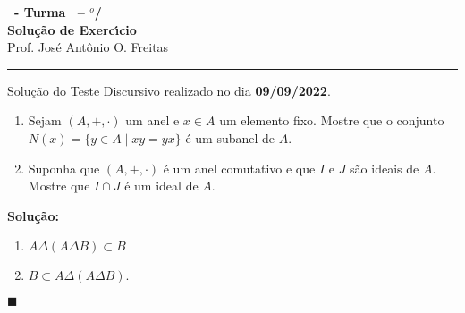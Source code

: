 \documentclass[12pt]{exam}
\renewcommand{\qedsymbol}{$\blacksquare$}
\begin{document}
    \begin{center}
        {\Large\bf \disciplina\ - Turma \turma\ -- \semestre$^{o}$/\ano} \\ \vspace{9pt} {\large\bf
        Solu\c{c}\~ao de Exerc{\'\i}cio}\\
        \vspace{9pt} Prof. Jos{\'e} Ant{\^o}nio O. Freitas
    \end{center}
    \hrule

    \vspace{.6cm}

    Solu\c{c}\~ao do Teste Discursivo realizado no dia \textbf{09/09/2022}.

    \vspace{.6cm}

    \questao{}
        \begin{enumerate}[label={\arabic*})]
            \item Sejam $(A, +, \cdot)$ um anel e $x \in A$ um elemento fixo. Mostre que o conjunto $N(x) = \{y \in A \mid xy = yx \}$ é um subanel de $A$.

            \vspace{2cm}

            \item Suponha que $(A, +, \cdot)$ é um anel comutativo e que $I$ e $J$ são ideais de $A$. Mostre que $I \cap J$ é um ideal de $A$.
        \end{enumerate}

    \noindent\textbf{Solu\c{c}\~ao:}
    \begin{enumerate}[label=({\roman*})]
        \item $A \Delta (A \Delta B) \subset B$
        \item $B \subset A \Delta (A \Delta B)$.
    \end{enumerate}

    \hspace{.1cm} \qedsymbol
\end{document}
